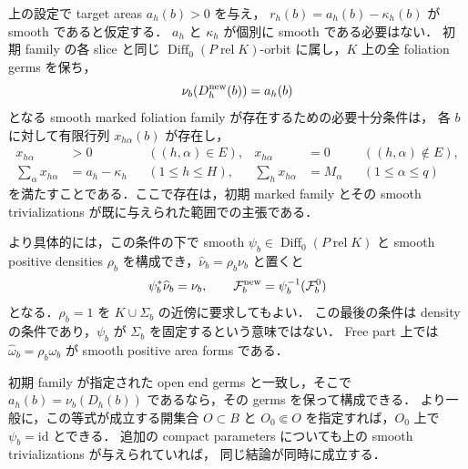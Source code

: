 \begin{theorem}
\label{ng8:componentwise-critical-area}
上の設定で target areas $a_h(b)>0$ を与え，
$r_h(b)=a_h(b)-\kappa_h(b)$ が smooth であると仮定する．
$a_h$ と $\kappa_h$ が個別に smooth である必要はない．
初期 family の各 slice と同じ $\operatorname{Diff}_0(P\operatorname{ rel}K)$-orbit
に属し，$K$ 上の全 foliation germs を保ち，
\[
 \nu_b(D_h^{\rm new}(b))=a_h(b)
\]
となる smooth marked foliation family が存在するための必要十分条件は，
各 $b$ に対して有限行列 $x_{h\alpha}(b)$ が存在し，
\begin{align}
 x_{h\alpha}&>0&&((h,\alpha)\in E),&
 x_{h\alpha}&=0&&((h,\alpha)\notin E),\label{ng8:transport-support}\\
 \sum_\alpha x_{h\alpha}&=a_h-\kappa_h&& (1\le h\le H),&
 \sum_h x_{h\alpha}&=M_\alpha&& (1\le\alpha\le q)
 \label{ng8:transport-margins}
\end{align}
を満たすことである．ここで存在は，初期 marked family とその smooth
trivializations が既に与えられた範囲での主張である．

より具体的には，この条件の下で smooth $\psi_b\in
\operatorname{Diff}_0(P\operatorname{ rel}K)$ と smooth positive densities
$\rho_b$ を構成でき，$\widehat\nu_b=\rho_b\nu_b$ と置くと
\[
 \psi_b^*\widehat\nu_b=\nu_b,
 \qquad \mathcal F_b^{\rm new}=\psi_b^{-1}(\mathcal F_b^0)
\]
となる．$\rho_b=1$ を $K\cup\Sigma_b$ の近傍に要求してもよい．
この最後の条件は density の条件であり，$\psi_b$ が $\Sigma_b$ を固定するという意味ではない．
Free part 上では $\widehat\omega_b=\rho_b\omega_b$ が smooth positive area forms である．

初期 family が指定された open end germs と一致し，そこで
$a_h(b)=\nu_b(D_h(b))$ であるなら，その germs を保って構成できる．
より一般に，この等式が成立する開集合 $O\subset B$ と
$O_0\Subset O$ を指定すれば，$O_0$ 上で $\psi_b=\mathrm{id}$ とできる．
追加の compact parameters についても上の smooth trivializations が与えられていれば，
同じ結論が同時に成立する．
\end{theorem}


